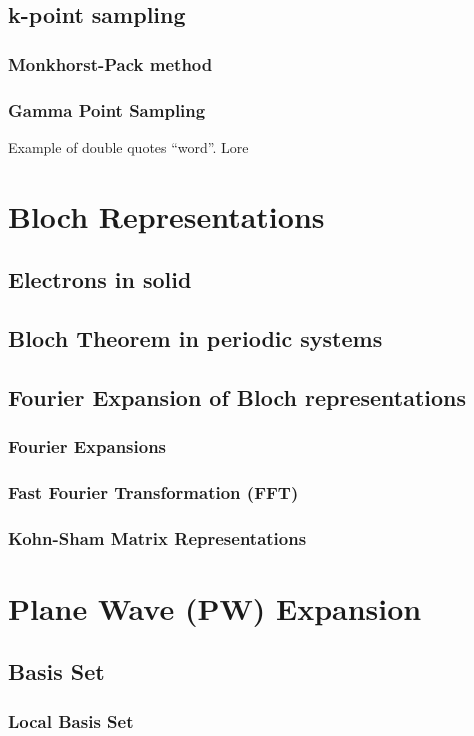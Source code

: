     \subsection{k-point sampling}
        \subsubsection{Monkhorst-Pack method}
        \subsubsection{Gamma Point Sampling}
        Example of double quotes ``word''. Lore
\section{Bloch Representations}
    \subsection{Electrons in solid}
    \subsection{Bloch Theorem in periodic systems}
    \subsection{Fourier Expansion of Bloch representations}
        \subsubsection{Fourier Expansions}
        \subsubsection{Fast Fourier Transformation (FFT)}
        \subsubsection{Kohn-Sham Matrix Representations}
\section{Plane Wave (PW) Expansion}
    \subsection{Basis Set}
        \subsubsection{Local Basis Set}
